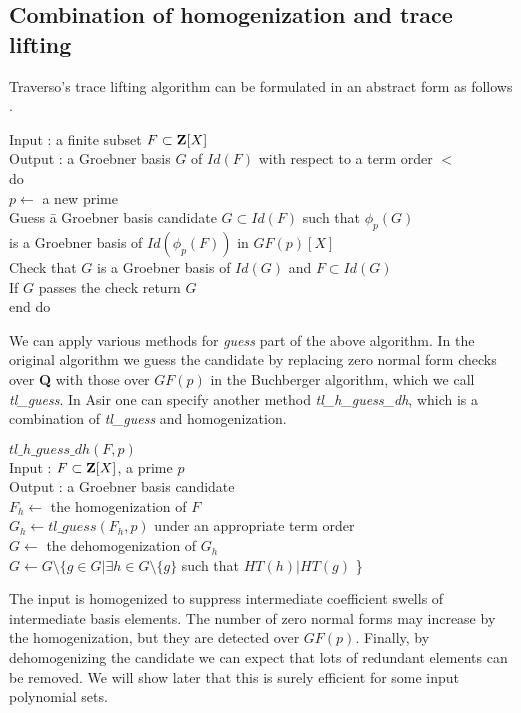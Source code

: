 \documentclass[runningheads]{cl2emult}
\begin{document}
\subsection{Combination of homogenization and trace lifting}

Traverso's trace lifting algorithm can be
formulated in an abstract form as follows \cite{FPARA}.
\begin{tabbing}
Input : a finite subset $F \subset {\bf Z}[X]$\\
Output : a Groebner basis $G$ of $Id(F)$ with respect to a term order $<$\\
do \= \\
\> $p \leftarrow$ a new prime\\
\>Guess \= a Groebner basis candidate $G \subset Id(F)$ 
such that $\phi_p(G)$ \\
\>\> is a Groebner basis of $Id(\phi_p(F))$ in ${GF(p)}[X]$\\
\>Check that $G$ is a Groebner basis of $Id(G)$ and $F \subset Id(G)$\\
\>If $G$ passes the check return $G$\\
end do
\end{tabbing}
We can apply various methods for {\it guess} part of the above
algorithm.  In the original algorithm we guess the candidate by
replacing zero normal form checks over {\bf Q} with those over $GF(p)$
in the Buchberger algorithm, which we call {\it tl\_guess}. In Asir
one can specify another method {\it tl\_h\_guess\_dh}, which is a
combination of {\it tl\_guess} and homogenization.
\begin{tabbing}
$tl\_h\_guess\_dh(F,p)$\\
Input : $F\subset {\bf Z}[X]$, a prime $p$\\
Output : a Groebner basis candidate\\
$F_h \leftarrow$ the homogenization of $F$\\
$G_h \leftarrow tl\_guess(F_h,p)$ under an appropriate term order\\
$G \leftarrow$ the dehomogenization of $G_h$\\
$G \leftarrow G \setminus \{g \in G| \exists h \in G \setminus \{g\}$
such that $HT(h)|HT(g)$ \}
\end{tabbing}
The input is homogenized to suppress intermediate coefficient swells
of intermediate basis elements.  The number of zero normal forms may
increase by the homogenization, but they are detected over
$GF(p)$. Finally, by dehomogenizing the candidate we can expect that
lots of redundant elements can be removed.  We will show later that this is
surely efficient for some input polynomial sets.
\end{document}

